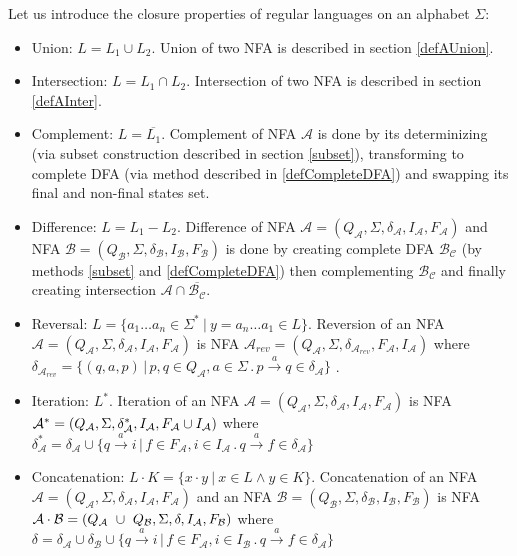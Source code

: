 		Let us introduce the closure properties of regular languages on an alphabet $\Sigma$:
		\begin{itemize}
			\item Union:  $L=L_1 \cup L_2$. Union of two NFA is described in section \ref{defAUnion}.
			\item Intersection:  $L=L_1 \cap L_2$. Intersection of two NFA is described in section \ref{defAInter}.
			\item Complement: $L=\overline{L_1}$.
      Complement of NFA $\mathcal{A}$ is done by its determinizing (via subset construction described in section \ref{subset}),
      transforming to complete DFA (via method described in \ref{defCompleteDFA}) and swapping its final and non-final states set.

      \item Difference: $L=L_1-L_2$. Difference of NFA $\mathcal{A}=(Q_\mathcal{A},\Sigma,\delta_\mathcal{A},I_\mathcal{A},F_\mathcal{A})$ 
      and NFA $\mathcal{B}=(Q_\mathcal{B},\Sigma,\delta_\mathcal{B},I_\mathcal{B},F_\mathcal{B})$ is done by creating
      complete DFA $\mathcal{B_C}$ (by methods \ref{subset} and \ref{defCompleteDFA}) then complementing $\mathcal{B_C}$ and
      finally creating intersection $\mathcal{A}\cap\overline{\mathcal{B_C}}$.

			\item Reversal: $L=\{a_1\dots a_n \in \Sigma^{*} \ |\ y=a_n\dots a_1 \in L\}$.
      Reversion of an NFA $\mathcal{A}=(Q_\mathcal{A},\Sigma,\delta_\mathcal{A},I_\mathcal{A},F_\mathcal{A})$ is
      NFA $\mathcal{A}_{rev}=(Q_{\mathcal{A}},\Sigma,\delta_{\mathcal{A}_{rev}},F_{\mathcal{A}},I_{\mathcal{A}})$ 
      where $\delta_{\mathcal{A}_{rev}}=\{(q,a,p)\,|\,p,q \in Q_\mathcal{A}, a \in \Sigma\,.\,p\xrightarrow{a}q\in\delta_{\mathcal{A}}\}$ .

      \item Iteration: $L^{*}$.
      Iteration of an NFA $\mathcal{A}=(Q_\mathcal{A},\Sigma,\delta_\mathcal{A},I_\mathcal{A},F_\mathcal{A})$ 
      is NFA $\mathcal{A}^{*}=(Q_\mathcal{A},\Sigma,\delta_\mathcal{A}^{*},I_\mathcal{A},\\F_\mathcal{A}\cup I_\mathcal{A})$ 
      where $\delta_\mathcal{A}^{*}=\delta_\mathcal{A}\cup
      \{q\xrightarrow{a}i\,|\,f\in F_\mathcal{A},i\in I_\mathcal{A}\,.\,q\xrightarrow{a}f \in \delta_\mathcal{A}\}$

			\item Concatenation: $L\cdot K=\{x \cdot y\ |\ x\in L \wedge y\in K\}$.
      Concatenation of an NFA $\mathcal{A}=(Q_\mathcal{A},\Sigma,\delta_\mathcal{A},I_\mathcal{A},F_\mathcal{A})$ and an NFA 
      $\mathcal{B}=(Q_\mathcal{B},\Sigma,\delta_\mathcal{B},I_\mathcal{B},F_\mathcal{B})$ is 
      NFA $\mathcal{A}\cdot\mathcal{B}=(Q_\mathcal{A}~\cup~Q_\mathcal{B},\Sigma,\delta,\\I_\mathcal{A},F_\mathcal{B})$ where $\delta=\delta_\mathcal{A} \cup
      \delta_\mathcal{B} \cup \{q\xrightarrow{a}i\,|\,f\in F_\mathcal{A},i\in I_\mathcal{B}\,.\,q\xrightarrow{a}f \in \delta_\mathcal{A}\}$

  \end{itemize}

